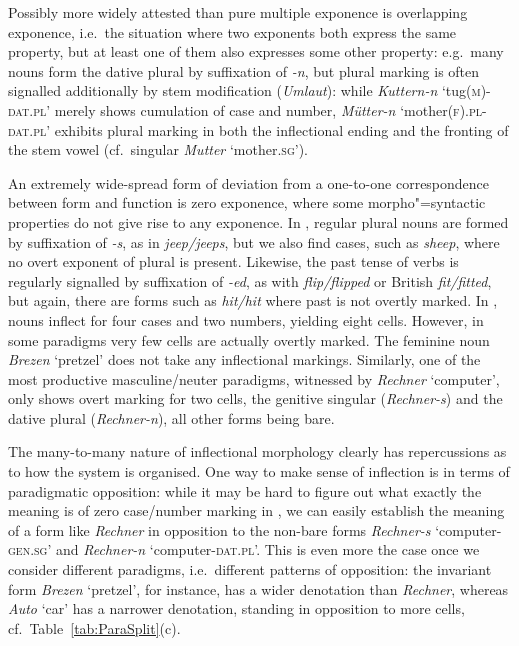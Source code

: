 \documentclass[output=paper
 	        ,biblatex
                ,babelshorthands
                ,newtxmath
                ,draftmode
                ,colorlinks, citecolor=brown
]{langscibook}
\begin{document}
Possibly more widely attested than pure multiple exponence is
overlapping exponence, i.e.\ the situation where two exponents both
express the same property, but at least one of them also expresses
some other property: e.g.\ many  nouns form the dative plural by
suffixation of \textit{-n}, but plural marking is often signalled
additionally by stem modification (\textit{Umlaut}): while
\textit{Kuttern-n} `tug(\textsc{m})-\textsc{dat.pl}' merely shows
cumulation of case and number, \textit{Mütter-n}
`mother(\textsc{f}).\textsc{pl}-\textsc{dat.pl}' exhibits plural
marking in both the inflectional ending and the fronting of the stem
vowel (cf.\ singular \textit{Mutter} `mother.\textsc{sg}').

An extremely wide-spread form of deviation from a one-to-one
correspondence between form and function is zero exponence, where some
morpho"=syntactic properties do not give rise to any exponence. In
, regular plural nouns are formed by suffixation of
\textit{-s}, as in \textit{jeep/jeeps}, but we also find cases, such
as \textit{sheep}, where no overt exponent of plural is
present. Likewise, the past tense of  verbs is regularly
signalled by suffixation of \textit{-ed}, as with
\textit{flip/flipped} or British  \textit{fit/fitted}, but
again, there are forms such as \textit{hit/hit} where past is not
overtly marked.  In , nouns inflect for four cases and two
numbers, yielding eight cells. However, in some paradigms very few
cells are actually overtly marked. The feminine noun \textit{Brezen}
`pretzel' does not take any inflectional markings. Similarly, one of
the most productive masculine/neuter paradigms, witnessed by
\textit{Rechner} `computer', only shows overt marking for two cells,
the genitive singular (\textit{Rechner-s}) and the dative plural
(\textit{Rechner-n}), all other forms being bare.



The many-to-many nature of inflectional morphology clearly has
repercussions as to how the system is organised.  One way to make
sense of inflection is in terms of paradigmatic opposition: while it
may be hard to figure out what exactly the meaning is of zero
case/number marking in , we can easily establish the meaning of
a form like \textit{Rechner} in opposition to the non-bare forms
\textit{Rechner-s} `computer-\textsc{gen.sg}' and \textit{Rechner-n}
`computer-\textsc{dat.pl}'. This is even more the case once we
consider different paradigms, i.e.\ different patterns of opposition:
the invariant form \textit{Brezen} `pretzel', for instance, has a wider
denotation than \textit{Rechner}, whereas \textit{Auto}
`car' has a narrower denotation,  standing in
opposition to more cells, cf.\ Table~\ref{tab:ParaSplit}(c).    
\end{document}
